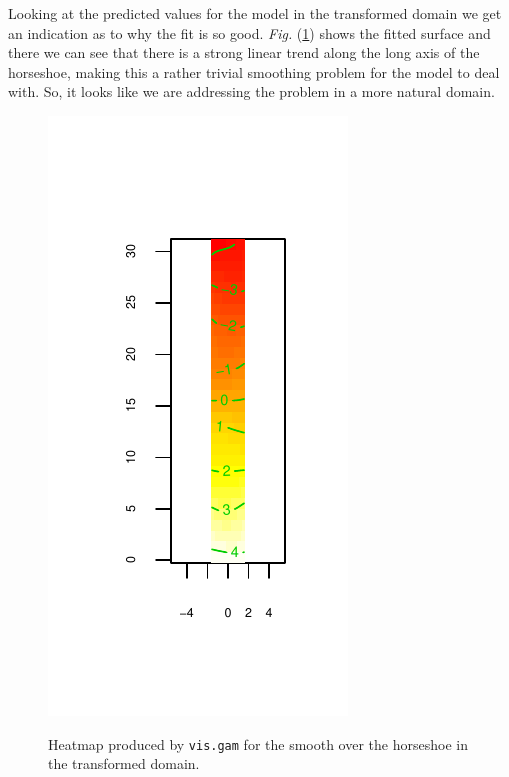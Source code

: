 \documentclass[a4paper,10pt]{amsart}
\newcommand{\Fig}[1]{\emph{Fig.} (\ref{#1})}
\begin{document}
Looking at the predicted values for the model in the transformed domain we get an indication as to why the fit is so good. \Fig{hsvisgam} shows the fitted surface and there we can see that there is a strong linear trend along the long axis of the horseshoe, making this a rather trivial smoothing problem for the model to deal with. So, it looks like we are addressing the problem in a more natural domain.

\begin{figure}
\centering
\includegraphics[trim=0in 0.5in 0in 0.1in]{figs/hsvisgam.pdf} \\
\caption{Heatmap produced by \texttt{vis.gam} for the smooth over the horseshoe in the transformed domain.}
\label{hsvisgam}
\end{figure}
\end{document}
